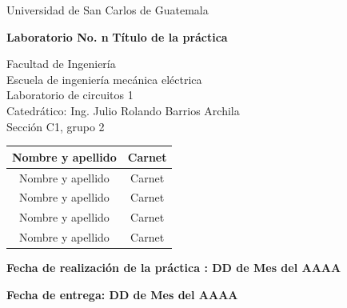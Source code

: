 \documentclass[osajnl,showpacs,superscriptaddress,10pt]{article}
\begin{document}
\begin{titlepage}
\null\vfill

\begin{center}
\begin{Large}
Universidad de San Carlos de Guatemala
\end{Large}
\end{center}



\begin{center}
\begin{Huge}
\textbf{Laboratorio No. n}
\textbf{Título de la práctica}
\end{Huge}
\end{center}



\begin{center}
\begin{normalsize}
Facultad de Ingeniería\\
Escuela de ingeniería mecánica eléctrica\\
Laboratorio de circuitos 1\\
Catedrático: Ing. Julio Rolando Barrios Archila\\
Sección C1, grupo 2\\
\end{normalsize}
\end{center}


\begin{table}[H]
\begin{center}
\begin{tabular}{c c}
\hline 
Nombre y apellido & Carnet \\ 
\hline 
Nombre y apellido & Carnet \\ 
\hline 
Nombre y apellido &  Carnet \\ 
\hline 
Nombre y apellido & Carnet \\ 
\hline 
Nombre y apellido & Carnet \\ 
\hline 
\end{tabular} 
\end{center}
\end{table}



\begin{center}
\textbf{Fecha de realización de la práctica : DD de Mes del AAAA}
\end{center}
\begin{center}
\textbf{Fecha de entrega: DD de Mes del AAAA}
\end{center}

\vfill

\end{titlepage}
\end{document}

